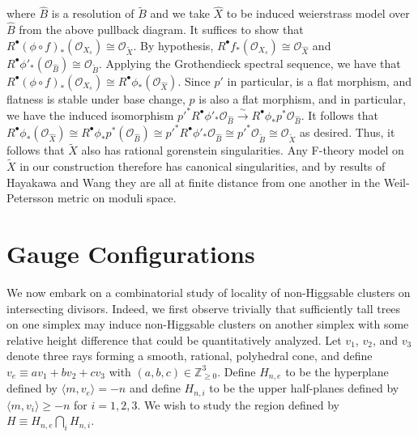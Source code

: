 \documentclass[aps,prl,twocolumn, superscriptaddress,groupedaddress,nofootinbib]{revtex4}
\begin{document}
where $\hat{B}$ is a resolution of $\tilde{B}$ and we take $\hat{X}$ to be induced weierstrass model over $\hat{B}$ from the above pullback diagram. It suffices to show that $R^{\bullet}(\phi\circ f)_{*}(\mathcal{O}_{X_{s}}) \cong \mathcal{O}_{\tilde{X}}$. By hypothesis, $R^{\bullet}f_{*}(\mathcal{O}_{X_{s}}) \cong \mathcal{O}_{\hat{X}}$ and $R^{\bullet}\phi'_{*}(\mathcal{O}_{\hat{B}}) \cong \mathcal{O}_{\tilde{B}}$. Applying the Grothendieck spectral sequence, we have that $R^{\bullet}(\phi\circ f)_{*}(\mathcal{O}_{X_{s}}) \cong R^{\bullet}\phi_{*}(\mathcal{O}_{\hat{X}})$. Since $p'$ in particular, is a flat morphism, and flatness is stable under base change, $p$ is also a flat morphism, and in particular, we have the induced isomorphism $p'^{*}R^{\bullet}\phi'_{*}\mathcal{O}_{\hat{B}} \xrightarrow{\sim} R^{\bullet}\phi_{*}p^{*}\mathcal{O}_{\hat{B}}$. It follows that $R^{\bullet}\phi_{*}(\mathcal{O}_{\hat{X}}) \cong R^{\bullet}\phi_{*}p^{*}(\mathcal{O}_{\hat{B}})\cong p'^{*}R^{\bullet}\phi'_{*}\mathcal{O}_{\hat{B}}\cong p'^{*}\mathcal{O}_{\tilde{B}} \cong \mathcal{O}_{\tilde{X}}$ as desired. Thus, it follows that $\tilde{X}$ also has rational gorenstein singularities.
Any F-theory model on $\tilde{X}$ in our construction therefore has canonical
singularities, and by results of Hayakawa \cite{Hayakawa} and Wang \cite{Wang}
they are all at finite distance from one another in the Weil-Petersson metric on moduli space.

\indent

\section{Gauge Configurations}
We now embark on a combinatorial study of locality of non-Higgsable clusters on intersecting divisors. Indeed, we first observe trivially that sufficiently tall trees on one simplex may induce non-Higgsable clusters on another simplex with some relative height difference that could be quantitatively analyzed. Let $v_{1}$, $v_{2}$, and $v_{3}$ denote three rays forming a smooth, rational, polyhedral cone, and define $v_{e} \equiv av_{1} + bv_{2} + cv_{3}$ with $(a,b,c) \in \mathbb{Z}^{3}_{\geq 0}$. Define $H_{n,e}$ to be the hyperplane defined by $\langle m,v_{e} \rangle = -n$ and define $H_{n,i}$ to be the upper half-planes defined by $\langle m,v_{i} \rangle \geq -n$ for $i = 1,2,3$. We wish to study the region defined by $H \equiv H_{n,e} \bigcap\limits_{i}H_{n,i}$. 
\end{document}
